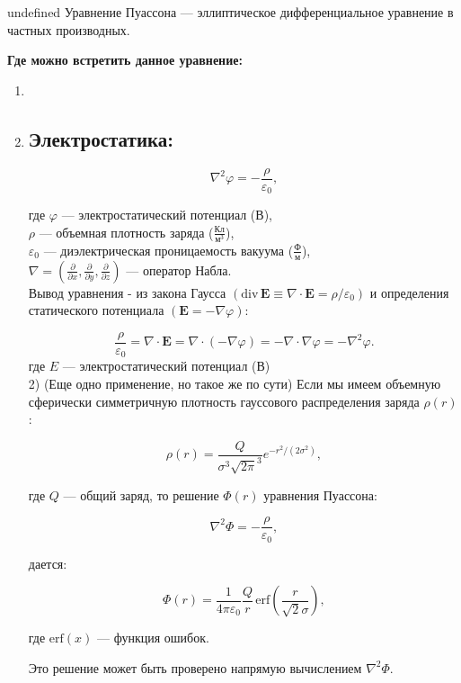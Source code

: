 undefined
Уравнение Пуассона — эллиптическое дифференциальное уравнение в частных производных.

\textbf{Где можно встретить данное уравнение:}

\begin{enumerate}
  \item 
  \item 

\subsection{ Электростатика: }

\begin{equation}
  \nabla^2 \varphi = -\frac{\rho}{\varepsilon_0},
\end{equation}

где $\varphi$ --- электростатический потенциал (В),\\
$\rho$ --- объемная плотность заряда ($\frac{\text{Кл}}{\text{м}^{3}}$),\\
$\varepsilon_0$ — диэлектрическая проницаемость вакуума ($\frac{\text{Ф}}{\text{м}}$),\\
$\nabla = \left( \frac{\partial}{\partial x}, \frac{\partial}{\partial y}, \frac{\partial}{\partial z} \right)$ — оператор Набла.
\\
Вывод уравнения - из закона Гаусса $(\mathrm{div}\,\mathbf{E} \equiv \nabla \cdot \mathbf{E} = \rho/ \varepsilon_0)$ и определения статического потенциала $(\mathbf{E} = -\nabla \varphi)$:

\begin{equation}
  \frac{\rho}{\varepsilon_0} = \nabla \cdot \mathbf{E} = \nabla \cdot (-\nabla \varphi) = - \nabla \cdot \nabla \varphi = - \nabla^2 \varphi.
\end{equation}
где $E$ — электростатический потенциал (В)\\

2) (Еще одно применение, но такое же по сути) Если мы имеем объемную сферически симметричную плотность гауссового распределения заряда $\rho(r)$:

\begin{equation}
  \rho(r) = \frac{Q}{\sigma^3\sqrt{2\pi}^3} e^{-r^2/(2\sigma^2)},
\end{equation}

где $Q$ — общий заряд, то решение $\Phi(r)$ уравнения Пуассона:

\begin{equation}
  \nabla^2 \Phi = -\frac{\rho}{\varepsilon_0},
\end{equation}

дается:

\begin{equation}
  \Phi(r) = \frac{1}{4 \pi \varepsilon_0} \frac{Q}{r}\,\mathrm{erf}\left(\frac{r}{\sqrt{2}\sigma}\right),
\end{equation}

где $\mathrm{erf}(x)$ — функция ошибок.

Это решение может быть проверено напрямую вычислением $\nabla^2 \Phi$.

\end{enumerate}

